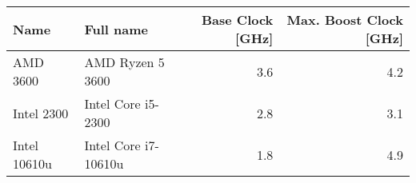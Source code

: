 \begin{tabular}{|l|l|r|r|}
  \hline
  Name         & Full name            & Base Clock [GHz] & Max. Boost Clock [GHz] \\
  \hline
  AMD 3600     & AMD Ryzen 5 3600     & 3.6              & 4.2                    \\
  Intel 2300   & Intel Core i5-2300   & 2.8              & 3.1                    \\
  Intel 10610u & Intel Core i7-10610u & 1.8              & 4.9                    \\
  \hline
\end{tabular}
